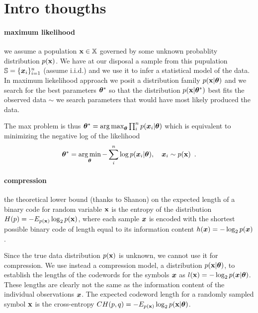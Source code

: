 \clearpage

\section{Intro thougths}\label{sec:thoughts}

\paragraph{maximum likelihood}
we assume a population ${\mathbf{x}} \in {\mathbb{X}}$ governed by some unknown probablity distribution $p({\mathbf{x}})$.
We have at our disposal a sample from this pupulation ${\mathbb{S}} = \{{\bm{x}}_i\}_{i=1}^n$ (assume i.i.d.) and we use it to infer a statistical model of the data.
In maximum liekelihood approach we posit a distribution family $p({\mathbf{x}} | {\bm{\theta}})$ and we search for the best parameters ${\bm{\theta}}^*$ so that the distribution $p({\mathbf{x}} | {\bm{\theta}}^*)$ best fits the observed data $\sim$ we search parameters that would have most likely produced the data.

The max  problem is thus
${\bm{\theta}}^* = \operatorname*{arg\,max}_{\bm{\theta}} \prod_i^n p({\bm{x}}_i | {\bm{\theta}})$
which is equivalent to minimizing the negative log of the likelihood
\begin{align}\label{fig:thoughts_nnl}
{\bm{\theta}}^* = \operatorname*{arg\,min}_{\bm{\theta}} - \sum_i^n \log p({\bm{x}}_i | {\bm{\theta}}), \quad {\bm{x}}_i \sim p({\mathbf{x}}) \enspace .
\end{align}


\paragraph{compression} the theoretical lower bound (thanks to Shanon) on the expected length of a binary code for random variable ${\mathbf{x}}$ is the entropy of the distribution $H(p) = - E_{p({\mathbf{x}})} \log_2 p({\mathbf{x}})$, where each sample ${\bm{x}}$ is encoded with the shortest possible binary code of length equal to its information content $h({\bm{x}}) = - \log_2 p({\bm{x}})$.

Since the true data distribution $p({\mathbf{x}})$ is unknown, we cannot use it for compression.
We use instead a compression model, a distribution $p({\mathbf{x}} | {\bm{\theta}})$, to establish the lengths of the codewords for the symbols ${\bm{x}}$ as $l({\mathbf{x}}) = - \log_2 p({\bm{x}} | {\bm{\theta}})$.
These lengths are clearly not the same as the information content of the individual observations ${\bm{x}}$.
The expected codeword length for a randomly sampled symbol ${\mathbf{x}}$ is the cross-entropy $CH(p, q) = - E_{p({\mathbf{x}})} \log_2 p({\mathbf{x}} | {\bm{\theta}})$.

